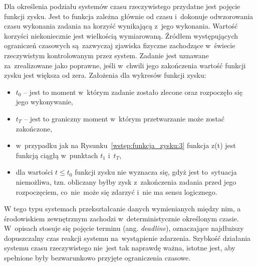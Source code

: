 Dla określenia podziału systemów czasu rzeczywistego przydatne jest pojęcie funkcji zysku. Jest to funkcja zależna głównie od czasu i~dokonuje odwzorowania czasu wykonania zadania na korzyść wynikającą z~jego wykonania. Wartość korzyści niekoniecznie jest wielkością wymiarowaną. Źródłem występujących ograniczeń czasowych są~zazwyczaj zjawiska fizyczne zachodzące w~świecie rzeczywistym kontrolowanym przez system. Zadanie jest uznawane za~zrealizowane jako poprawne, jeśli w~chwili jego zakończenia wartość funkcji zysku jest większa od zera.
\clearpage
Założenia dla wykresów funkcji zysku:
\begin{itemize}
\item $t_0$ -- jest to moment w~którym zadanie zostało zlecone oraz rozpoczęło się jego wykonywanie,
\item $t_T$ -- jest to graniczny moment w~którym przetwarzanie może zostać zakończone,
\item w~przypadku jak na Rysunku~\ref{wstęp:funkcja_zysku:3} funkcja z(t) jest funkcją ciągłą w~punktach $t_1$ i~$t_T$,
\item dla wartości $t \leq t_0$ funkcji zysku nie wyznacza się, gdyż jest to~sytuacja niemożliwa, tzn. obliczany byłby zysk z~zakończenia zadania przed jego rozpoczęciem, co~nie~może się zdarzyć i~nie ma sensu logicznego.
\end{itemize}

W tego typu systemach przekształcanie danych wymienianych między nim, a środowiskiem zewnętrznym zachodzi w~deterministycznie określonym czasie. W~opisach stosuje się pojęcie terminu (ang. \textit{deadline}), oznaczające najdłuższy dopuszczalny czas reakcji systemu na~wystąpienie zdarzenia. Szybkość działania systemu czasu rzeczywistego nie~jest tak naprawdę ważna, istotne jest, aby spełnione były bezwarunkowo przyjęte ograniczenia czasowe.

